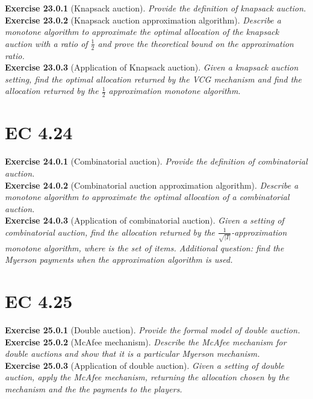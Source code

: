 \textbf{Exercise 23.0.1} (Knapsack auction). \textit{Provide the definition of knapsack auction.}\\

\textbf{Exercise 23.0.2} (Knapsack auction approximation algorithm). \textit{Describe a monotone algorithm to approximate the optimal allocation of the knapsack auction with a ratio of $\frac{1}{2}$ and prove the theoretical bound on the approximation ratio.}\\

\textbf{Exercise 23.0.3} (Application of Knapsack auction). \textit{Given a knapsack auction setting, find the optimal allocation returned by the VCG mechanism and find the allocation returned by the $\frac{1}{2}$ approximation monotone algorithm.}\\

\section{EC 4.24}

\textbf{Exercise 24.0.1} (Combinatorial auction). \textit{Provide the definition of combinatorial auction.}\\

\textbf{Exercise 24.0.2} (Combinatorial auction approximation algorithm). \textit{Describe a monotone algorithm to approximate the optimal allocation of a combinatorial auction.}\\

\textbf{Exercise 24.0.3} (Application of combinatorial auction). \textit{Given a setting of combinatorial auction, find the allocation returned by the $\frac{1}{\sqrt{|I|}}$-approximation monotone algorithm, where is the set of items. Additional question: find the Myerson payments when the approximation algorithm is used.}

\section{EC 4.25}

\textbf{Exercise 25.0.1} (Double auction). \textit{Provide the formal model of double auction.}\\

\textbf{Exercise 25.0.2} (McAfee mechanism). \textit{Describe the McAfee mechanism for double auctions and show that it is a particular Myerson mechanism.}\\

\textbf{Exercise 25.0.3} (Application of double auction). \textit{Given a setting of double auction, apply the McAfee mechanism, returning the allocation chosen by the mechanism and the the payments to the players.}

